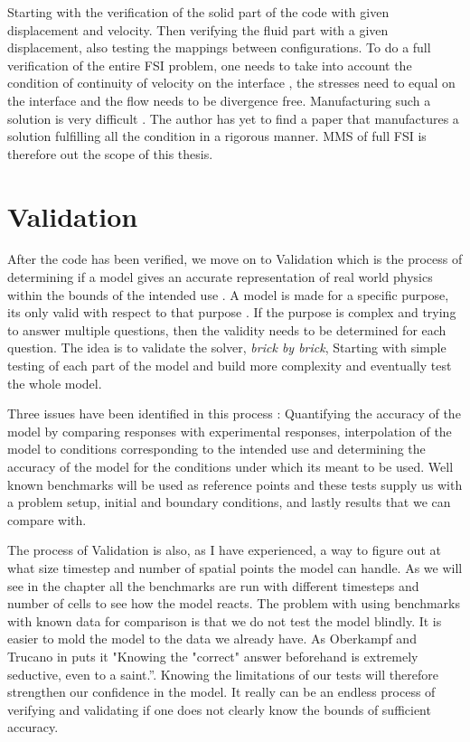 Starting with the verification of the solid part of the code with given displacement and velocity. Then verifying the fluid part with a given displacement, also testing the mappings between configurations. 
To do a full verification of the entire FSI problem, one needs to take into account the condition of continuity of velocity on the interface \cite{Etienne2006}, the stresses need to equal on the interface and the flow needs to be divergence free. Manufacturing such a solution is very difficult \cite{Etienne2012}. The author has yet to find a paper that manufactures a solution fulfilling all the condition in a rigorous manner.
MMS of full FSI is therefore  out the scope of this thesis. 


\newpage

\section{Validation}
After the code has been verified, we move on to Validation which is the process of determining if a model gives an accurate representation of real world physics within the bounds of the intended use \cite{Selin2014}. A model is made for a specific purpose, its only valid with respect to that purpose \cite{Macal2005}. If the purpose is complex and trying to answer multiple questions, then the validity needs to be determined for each question. The idea is to validate the solver, \textsl{brick by brick}, Starting with simple testing of each part of the model and build more complexity and eventually test the whole model.\newline

Three issues have been identified in this process \cite{Selin2014}: Quantifying the accuracy of the model by comparing responses with experimental responses, interpolation of the model to conditions corresponding to the intended use and determining the accuracy of the model for the conditions under which its meant to be used. Well known benchmarks will be used as reference points and these tests supply us with a problem setup, initial and boundary conditions, and lastly results that we can compare with. \newline

The process of Validation is also, as I have experienced, a way to figure out at what size timestep and number of spatial points the model can handle. As we will see in the chapter all the benchmarks are run with different timesteps and number of cells to see how the model reacts. The problem with using benchmarks with known data for comparison is that we do not test the model blindly. It is easier to mold the model to the data we already have. As Oberkampf and Trucano in \cite{Selin2014} puts it "Knowing the "correct" answer beforehand is extremely seductive, even to a saint.''. Knowing the limitations of our tests will therefore strengthen our confidence in the model. It really can be an endless process of verifying and validating if one does not clearly know the bounds of sufficient accuracy. \cite{Selin2014} \\


